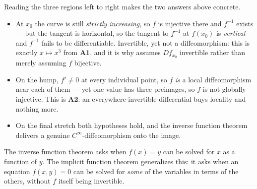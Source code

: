 Reading the three regions left to right makes the two answers above concrete.

\begin{itemize}
  \item At $x_0$ the curve is still \emph{strictly increasing}, so $f$ is injective there and
    $f^{-1}$ exists --- but the tangent is horizontal, so the tangent to $f^{-1}$ at $f(x_0)$ is
    \emph{vertical} and $f^{-1}$ fails to be differentiable. Invertible, yet not a
    diffeomorphism: this is exactly $x \mapsto x^3$ from \textbf{A1}, and it is why
     assumes $Df_{x_0}$ invertible rather than merely
    assuming $f$ bijective.
  \item On the hump, $f' \neq 0$ at every individual point, so $f$ \emph{is} a local
    diffeomorphism near each of them --- yet one value has three preimages, so $f$ is not
    globally injective. This is \textbf{A2}: an everywhere-invertible differential buys locality
    and nothing more.
  \item On the final stretch both hypotheses hold, and the inverse function theorem delivers a
    genuine $C^\infty$-diffeomorphism onto the image.
\end{itemize}

\begin{center}
\end{center}

The inverse function theorem asks when $f(x)=y$ can be solved for $x$ as a function of $y$. The
implicit function theorem generalizes this: it asks when an equation $f(x,y)=0$ can be solved for
\emph{some} of the variables in terms of the others, without $f$ itself being invertible.

